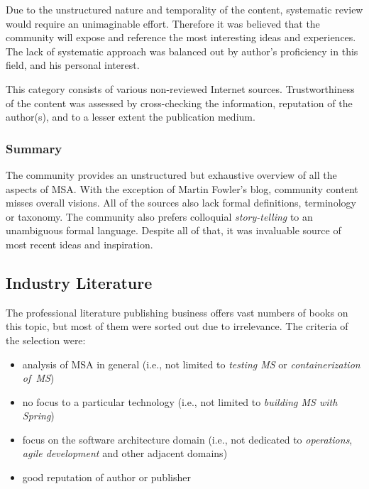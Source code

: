 \documentclass[thesis=M,english,hidelinks]{FITthesis}[2012/10/20]
\begin{document}
Due to the unstructured nature and temporality of the content, systematic review would require an unimaginable effort. Therefore it was believed that the community will expose and reference the most interesting ideas and experiences. The lack of systematic approach was balanced out by author's proficiency in this field, and his personal interest.

This category consists of various non-reviewed Internet sources. Trustworthiness of the content was assessed by cross-checking the information, reputation of the author(s), and to a lesser extent the publication medium.
\subsubsection*{Summary}
The community provides an unstructured but exhaustive overview of all the aspects of \acrshort{MSA}. With the exception of Martin Fowler's blog, community content misses overall visions. All of the sources also lack formal definitions, terminology or taxonomy. The community also prefers colloquial \textit{story-telling} to an unambiguous formal language. Despite all of that, it was invaluable source of most recent ideas and inspiration. 

\subsection{Industry Literature}
The professional literature publishing business offers vast numbers of books on this topic, but most of them were sorted out due to irrelevance. The criteria of the selection were:
\begin{itemize}
    \item analysis of \acrshort{MSA} in general (i.e., not limited to \textit{testing \acrshort{MS}} or \textit{containerization of~\acrshort{MS}})
    \item no focus to a particular technology (i.e., not limited to \textit{building \acrshort{MS} with Spring})
    \item focus on the software architecture domain (i.e., not dedicated to \textit{operations}, \textit{agile development} and other adjacent domains)
    \item good reputation of author or publisher
\end{itemize}
\end{document}
